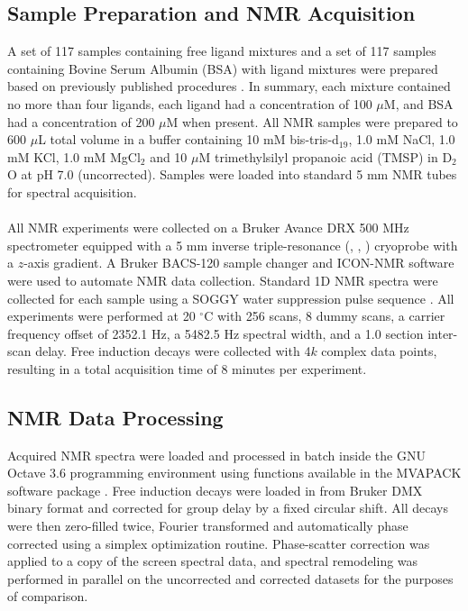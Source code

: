 \subsection{Sample Preparation and NMR Acquisition}

\begin{doublespace}
A set of 117 samples containing free ligand mixtures and a set of 117 samples
containing Bovine Serum Albumin (BSA) with ligand mixtures were prepared based
on previously published procedures \cite{powers:ddt2008,mercier:cchts2009}.
In summary, each mixture contained no more than four ligands, each ligand had
a concentration of 100 $\mu$M, and BSA had a concentration of 200 $\mu$M when
present. All NMR samples were prepared to 600 $\mu$L total volume in a buffer
containing 10 mM bis-tris-d$_{19}$, 1.0 mM NaCl, 1.0 mM KCl, 1.0 mM MgCl$_2$
and 10 $\mu$M trimethylsilyl propanoic acid (TMSP) in D$_2$O at pH 7.0
(uncorrected). Samples were loaded into standard 5 mm NMR tubes for spectral
acquisition.
\\\\
All NMR experiments were collected on a Bruker Avance DRX 500 MHz spectrometer
equipped with a 5 mm inverse triple-resonance (\hnmr{}, \cnmr{}, \nnmr{})
cryoprobe with a $z$-axis gradient. A Bruker BACS-120 sample changer and
ICON-NMR software were used to automate NMR data collection. Standard 1D
\hnmr{} NMR spectra were collected for each sample using a SOGGY water
suppression pulse sequence \cite{hwang:jmr1995,nguyen:jmr2007}. All
experiments were performed at 20 $^\circ$C with 256 scans, 8 dummy scans,
a carrier frequency offset of 2352.1 Hz, a 5482.5 Hz spectral width, and a 1.0
section inter-scan delay. Free induction decays were collected with 4$k$
complex data points, resulting in a total acquisition time of 8 minutes per
experiment.
\end{doublespace}

\subsection{NMR Data Processing}

\begin{doublespace}
Acquired NMR spectra were loaded and processed in batch inside the GNU Octave
3.6 programming environment \cite{eaton2008} using functions available in the
MVAPACK software package \cite{worley:acscb2014}. Free induction decays were
loaded in from Bruker DMX binary format and corrected for group delay by a
fixed circular shift. All decays were then zero-filled twice, Fourier
transformed and automatically phase corrected using a simplex optimization
routine. Phase-scatter correction was applied to a copy of the screen spectral
data, and spectral remodeling was performed in parallel on the uncorrected and
corrected datasets for the purposes of comparison.
\end{doublespace}

